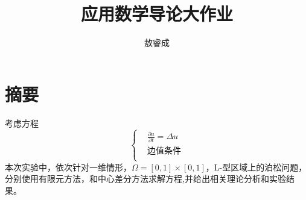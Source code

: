 \documentclass[12pt,fontset=mac]{ctexart}
\begin{document}
	
\author{敖睿成}
\title{应用数学导论大作业}\date{}
\maketitle

\section{摘要}
考虑方程
$$\left\{
\begin{aligned}
&\frac{\partial u}{\partial t} = \Delta u\\
&\mbox{边值条件} \\
\end{aligned}
\right.$$
本次实验中，依次针对一维情形，$ \Omega = [0,1]\times [0,1]$，L-型区域上的泊松问题，分别使用有限元方法，和中心差分方法求解方程,并给出相关理论分析和实验结果。
\end{document}
